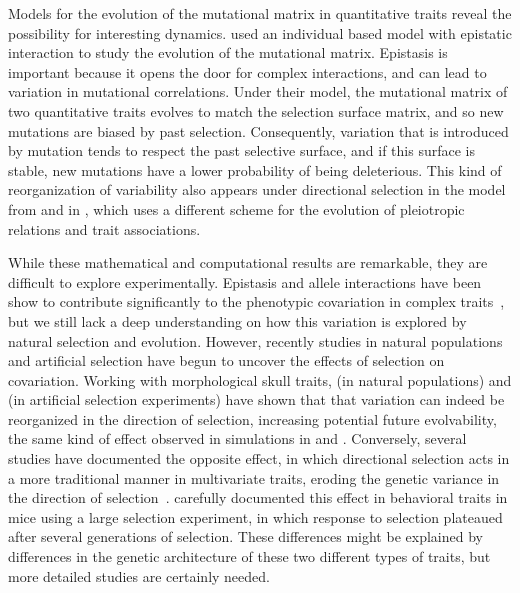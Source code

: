 \begin{refsection}
Models for the evolution of the mutational matrix in quantitative traits
reveal the possibility for interesting dynamics. \textcite{Jones2014-wj} used an
individual based model with epistatic interaction to study the evolution
of the mutational matrix. Epistasis is important because it opens the
door for complex interactions, and can lead to variation in mutational
correlations. Under their model, the mutational matrix of two
quantitative traits evolves to match the selection surface matrix, and
so new mutations are biased by past selection. Consequently, variation
that is introduced by mutation tends to respect the past selective
surface, and if this surface is stable, new mutations have a lower
probability of being deleterious. This kind of reorganization of
variability also appears under directional selection in the model from
\textcite{Pavlicev2011-wz} and in \textcite{Draghi2008-cv}, which uses a different scheme
for the evolution of pleiotropic relations and trait associations.

While these mathematical and computational results are remarkable, they
are difficult to explore experimentally.
Epistasis and allele interactions
have been show to contribute significantly to the phenotypic covariation
in complex traits~\parencite{Cheverud2004-qr, Wolf2005-nr, Wolf2006-xt, 
Pavlicev2008-jy, Huang2012-si}, but we still lack a deep
understanding on how this variation is explored by natural selection and
evolution. However, recently studies in natural populations and
artificial selection have begun to uncover the effects of selection on
covariation. Working with morphological skull traits, \textcite{Assis2016-vz} (in
natural populations) and \textcite{Penna2017-if} (in artificial selection
experiments) have shown that that variation can indeed be reorganized in
the direction of selection, increasing potential future evolvability,
the same kind of effect observed in simulations in \textcite{Pavlicev2011-wz} and
\textcite{Melo2015-bk}. Conversely, several studies have documented the opposite
effect, in which directional selection acts in a more traditional manner
in multivariate traits, eroding the genetic variance in the direction of
selection~\parencite{Walsh2009-cn}. \textcite{Careau2015-sy} carefully documented this
effect in behavioral traits in mice using a large selection experiment,
in which response to selection plateaued after several generations of
selection. These differences might be explained by differences in the
genetic architecture of these two different types of traits, but more
detailed studies are certainly needed.


\end{refsection}
